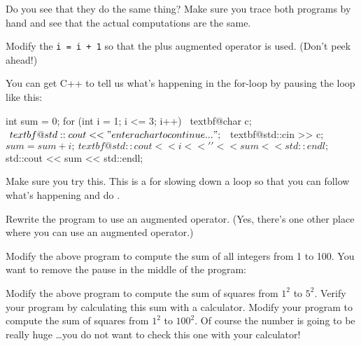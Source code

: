 Do you see that they do the same thing? Make sure you trace both
programs by hand and see that the actual computations are the same.

\begin{ex}
Modify the \texttt{i = i + 1} so that the plus
augmented operator is used. (Don't peek ahead!)
\end{ex}
\begin{ex}
You can get C++ to tell us what's
happening in the for-loop by pausing the loop like this:
\begin{console}[commandchars=\~\@\$]
int sum = 0;
for (int i = 1; i <= 3; i++)
{   
     ~textbf@char c;$
     ~textbf@std::cout << "enter a char to continue ...";$
     ~textbf@std::cin >> c;$

     sum = sum + i;
     ~textbf@std::cout << i << ' ' << sum << std::endl;$
}
std::cout << sum << std::endl;
\end{console}
\end{ex}

Make sure you try this. This is a  for
slowing down a loop so that you can follow what's
happening and do .

\begin{ex}
 Rewrite the program to use an augmented operator.
(Yes, there's one other place where you can use an
augmented operator.)
\end{ex}

\begin{ex}
 Modify the above program to compute the sum of all
integers from 1 to 100. You want to remove the pause in the middle of
the program:
    
\end{ex}

\begin{ex}
Modify the above program to compute the sum of squares from $1^{2}$ to $5^{2}$. Verify your program by calculating this sum with a calculator. Modify your program to compute the sum of squares from $1^{2}$ to $100^{2}$. Of course the number is going to be really huge \ldots you do not want to check this one with your calculator!
\end{ex}

